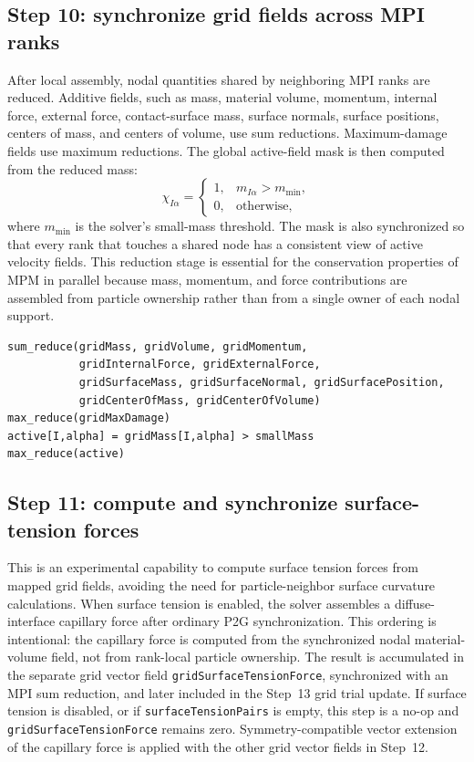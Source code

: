 \subsection{Step 10: synchronize grid fields across MPI ranks}
\label{subsec:solver-step-10}
After local assembly, nodal quantities shared by neighboring MPI ranks are reduced.  Additive fields, such as mass, material volume, momentum, internal force, external force, contact-surface mass, surface normals, surface positions, centers of mass, and centers of volume, use sum reductions.  Maximum-damage fields use maximum reductions.  The global active-field mask is then computed from the reduced mass:
\begin{equation}
  \chi_{I\alpha}=\begin{cases}
  1, & m_{I\alpha} > m_{\min},\\
  0, & \text{otherwise},
  \end{cases}
\end{equation}
where $m_{\min}$ is the solver's small-mass threshold.  The mask is also synchronized so that every rank that touches a shared node has a consistent view of active velocity fields.  This reduction stage is essential for the conservation properties of MPM in parallel because mass, momentum, and force contributions are assembled from particle ownership rather than from a single owner of each nodal support.

\begin{lstlisting}[caption={Grid synchronization.},basicstyle=\ttfamily\small]
sum_reduce(gridMass, gridVolume, gridMomentum,
           gridInternalForce, gridExternalForce,
           gridSurfaceMass, gridSurfaceNormal, gridSurfacePosition,
           gridCenterOfMass, gridCenterOfVolume)
max_reduce(gridMaxDamage)
active[I,alpha] = gridMass[I,alpha] > smallMass
max_reduce(active)
\end{lstlisting}

\subsection{Step 11: compute and synchronize surface-tension forces}
\label{subsec:solver-step-11}
This is an experimental capability to compute surface tension forces from mapped grid fields, avoiding the need for particle-neighbor surface curvature calculations.  When surface tension is enabled, the solver assembles a diffuse-interface capillary force after ordinary P2G synchronization.  This ordering is intentional: the capillary force is computed from the synchronized nodal material-volume field, not from rank-local particle ownership.  The result is accumulated in the separate grid vector field \texttt{gridSurfaceTensionForce}, synchronized with an MPI sum reduction, and later included in the Step~13 grid trial update.  If surface tension is disabled, or if \texttt{surfaceTensionPairs} is empty, this step is a no-op and \texttt{gridSurfaceTensionForce} remains zero.  Symmetry-compatible vector extension of the capillary force is applied with the other grid vector fields in Step~12.

